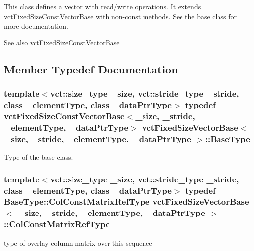 This class defines a vector with read/write operations. It extends \hyperlink{classvct_fixed_size_const_vector_base}{vct\+Fixed\+Size\+Const\+Vector\+Base} with non-\/const methods. See the base class for more documentation.

\begin{DoxySeeAlso}{See also}
\hyperlink{classvct_fixed_size_const_vector_base}{vct\+Fixed\+Size\+Const\+Vector\+Base} 
\end{DoxySeeAlso}


\subsection{Member Typedef Documentation}
\hypertarget{classvct_fixed_size_vector_base_a91288c3a362ee7685859f42a9a3667c4}{}
\subsubsection[{Base\+Type}]{\setlength{\rightskip}{0pt plus 5cm}template$<$vct\+::size\+\_\+type \+\_\+size, vct\+::stride\+\_\+type \+\_\+stride, class \+\_\+element\+Type, class \+\_\+data\+Ptr\+Type$>$ typedef {\bf vct\+Fixed\+Size\+Const\+Vector\+Base}$<$\+\_\+size, \+\_\+stride, \+\_\+element\+Type, \+\_\+data\+Ptr\+Type$>$ {\bf vct\+Fixed\+Size\+Vector\+Base}$<$ \+\_\+size, \+\_\+stride, \+\_\+element\+Type, \+\_\+data\+Ptr\+Type $>$\+::{\bf Base\+Type}}\label{classvct_fixed_size_vector_base_a91288c3a362ee7685859f42a9a3667c4}
Type of the base class. \hypertarget{classvct_fixed_size_vector_base_af2eb123c105381e108d3a94c3ba301b4}{}
\subsubsection[{Col\+Const\+Matrix\+Ref\+Type}]{\setlength{\rightskip}{0pt plus 5cm}template$<$vct\+::size\+\_\+type \+\_\+size, vct\+::stride\+\_\+type \+\_\+stride, class \+\_\+element\+Type, class \+\_\+data\+Ptr\+Type$>$ typedef {\bf Base\+Type\+::\+Col\+Const\+Matrix\+Ref\+Type} {\bf vct\+Fixed\+Size\+Vector\+Base}$<$ \+\_\+size, \+\_\+stride, \+\_\+element\+Type, \+\_\+data\+Ptr\+Type $>$\+::{\bf Col\+Const\+Matrix\+Ref\+Type}}\label{classvct_fixed_size_vector_base_af2eb123c105381e108d3a94c3ba301b4}
type of overlay column matrix over this sequence \hypertarget{classvct_fixed_size_vector_base_a6b661e308612cbe1c894c62812c272e2}{}
